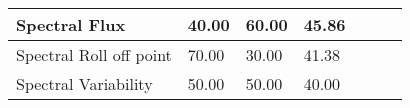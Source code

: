 \begin{table}[h!]
\begin{center}
\begin{tabular}{|l|l|l|l|l|l|l|}
                        Spectral Flux
                        &
                        40.00
                        &
                        60.00
                        &
                        45.86
                        \\\hline

                        Spectral Roll off point
                        &
                        70.00
                        &
                        30.00
                        &
                        41.38
                        \\\hline

                        Spectral Variability
                        &
                        50.00
                        &
                        50.00
                        &
                        40.00
                        \\\hline

                 \end{tabular}
        \end{center}
\end{table}

